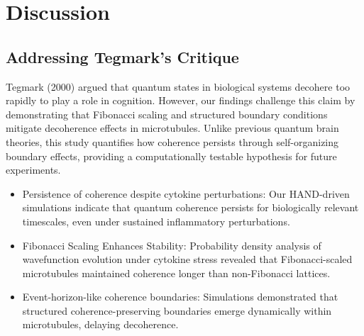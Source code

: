 \section{Discussion}
\subsection{Addressing Tegmark's Critique}
Tegmark (2000) argued that quantum states in biological systems decohere too rapidly to play a role in cognition. However, our findings challenge this claim by demonstrating that Fibonacci scaling and structured boundary conditions mitigate decoherence effects in microtubules. Unlike previous quantum brain theories, this study quantifies how coherence persists through self-organizing boundary effects, providing a computationally testable hypothesis for future experiments.
\begin{itemize}
    \item Persistence of coherence despite cytokine perturbations: Our HAND-driven simulations indicate that quantum coherence persists for biologically relevant timescales, even under sustained inflammatory perturbations.
    \item Fibonacci Scaling Enhances Stability: Probability density analysis of wavefunction evolution under cytokine stress revealed that Fibonacci-scaled microtubules maintained coherence longer than non-Fibonacci lattices.
    \item Event-horizon-like coherence boundaries: Simulations demonstrated that structured coherence-preserving boundaries emerge dynamically within microtubules, delaying decoherence.
\end{itemize}

